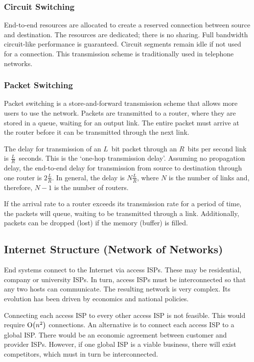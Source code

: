 \subsubsection{Circuit Switching}

End-to-end resources are allocated to create a reserved connection between source and destination.
The resources are dedicated; there is no sharing.
Full bandwidth circuit-like performance is guaranteed.
Circuit segments remain idle if not used for a connection.
This transmission scheme is traditionally used in telephone networks.

\subsubsection{Packet Switching}

Packet switching is a store-and-forward transmission scheme that allows more users to use the network.
Packets are transmitted to a router, where they are stored in a queue, waiting for an output link.
The entire packet must arrive at the router before it can be transmitted through the next link.

The delay for transmission of an \( L \)~bit packet through an \( R \)~bits per second link is \( \frac{L}{R} \)~seconds.
This is the `one-hop transmission delay'.
Assuming no propagation delay, the end-to-end delay for transmission from source to destination through one router is \( 2 \frac{L}{R} \).
In general, the delay is \( N \frac{L}{R} \), where \( N \) is the number of links and, therefore, \( N - 1 \) is the number of routers.

If the arrival rate to a router exceeds its transmission rate for a period of time, the packets will queue, waiting to be transmitted through a link.
Additionally, packets can be dropped (lost) if the memory (buffer) is filled.

\subsection{Internet Structure (Network of Networks)}

End systems connect to the Internet via access ISPs.
These may be residential, company or university ISPs.
In turn, access ISPs must be interconnected so that any two hosts can communicate.
The resulting network is very complex.
Its evolution has been driven by economics and national policies.

Connecting each access ISP to every other access ISP is not feasible.
This would require \( \textup{O}\!\left( n^2 \right) \) connections.
An alternative is to connect each access ISP to a global ISP\@.
There would be an economic agreement between customer and provider ISPs.
However, if one global ISP is a viable business, there will exist competitors, which must in turn be interconnected.

